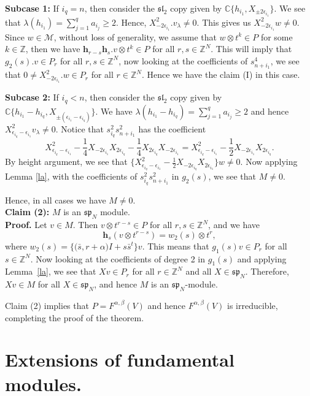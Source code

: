 \documentclass[a4paper,11pt]{amsart}
\numberwithin{equation}{section}
\theoremstyle{plain}
\newcommand{\Z}{\mathbb{Z}}
\newcommand{\C}{\mathbb{C}}
\newcommand{\s}{\mathfrak{sp}_{N}}
\renewcommand{\H}{\mathbf{h}}
\begin{document}
{\bf Subcase 1:} If $i_q=n$, then consider the $\mathfrak{sl}_2$ copy given by $\C\{h_{i_1}, X_{\pm 2\epsilon_{i_1}}\}$. We see that $\lambda(h_{i_1})=\sum_{j=1}^qa_{i_j}\geq 2$. Hence, $X_{-2\epsilon_{i_1}}^2.v_{\lambda}\neq 0$. This  gives us $X_{-2\epsilon_{i_1}}^2w\neq 0$. 
Since $w\in \mathcal{M}$, without loss of generality, we assume that $w\otimes t^k\in P$ for some $k\in \Z$, then we have $\H_{r-s}\H_s.v\otimes t^k\in P$ for all $r,s\in \Z^N$.
This will imply that $g_2(s).v\in P_r$ for all $r,s \in \Z^N$, now looking at the coefficients of $s_{n+i_1}^4$, we see that $0\neq X^2_{-2\epsilon_{i_1}}.w\in P_{r}$ for all $r\in \Z^N$.
Hence we have the claim (I) in this case. 

    {\bf Subcase 2:} If $i_q<n$, then consider the $\mathfrak{sl}_2$ copy given by $\C\{h_{i_1}-h_{i_q}, X_{\pm (\epsilon_{i_1}-\epsilon_{i_q})}\}$. We have $\lambda(h_{i_1}-h_{i_q})=\sum_{j=1}^qa_{i_j}\geq 2$ and hence $X_{\epsilon_{i_q}-\epsilon_{i_1}}^2v_{\lambda}\neq 0$.  Notice that $s_{i_q}^2s_{n+i_1}^2$ has the coefficient $$X_{\epsilon_{i_q}-\epsilon_{i_1}}^2-\frac{1}{4}X_{-2\epsilon_{i_1}}X_{2\epsilon_{i_q}}-\frac{1}{4}X_{2\epsilon_{i_q}}X_{-2\epsilon_{i_1}}=X_{\epsilon_{i_q}-\epsilon_{i_1}}^2-\frac{1}{2}X_{-2\epsilon_{i_1}}X_{2\epsilon_{i_q}}.$$ By height argument, we see that $\{X_{\epsilon_{i_q}-\epsilon_{i_1}}^2-\frac{1}{2}X_{-2\epsilon_{i_q}}X_{2\epsilon_{i_1}}\}w\neq 0$. Now applying Lemma \ref{la}, with the coefficients of $s_{i_q}^2s_{n+i_1}^2$ in $g_2(s)$, we see that $M\neq 0$.

    Hence, in all cases we  have $M\neq 0$. \\

 
{\bf Claim (2):} $M$ is an $\s$ module.\\

{\bf Proof.} Let $v\in M$. Then $v\otimes t^{r-s}\in P$ for all $r,s\in \Z^N$, and we have $$\H_s(v\otimes t^{r-s})=w_2(s)\otimes t^{r},$$ where $w_2(s)=\{\bm{(}\bar{s}, r+\alpha\bm{)}I+s\bar{s}^t\}v$. This means that $g_1(s)v\in P_{r}$ for all $s\in \Z^N$. Now looking at the coefficients of degree 2 in $g_1(s)$ and  applying Lemma~\ref{la}, we see that $Xv\in P_r$ for all $r\in \Z^N$ and all $X\in \s$. Therefore, $Xv\in M$ for all $X\in \s$, and hence $M$ is an $\s$-module.

Claim (2) implies that $P=F^{\alpha,\beta}(V)$ and hence $F^{\alpha,\beta}(V)$ is irreducible, completing the proof of the theorem.



\section{Extensions of fundamental modules.}
\end{document}
